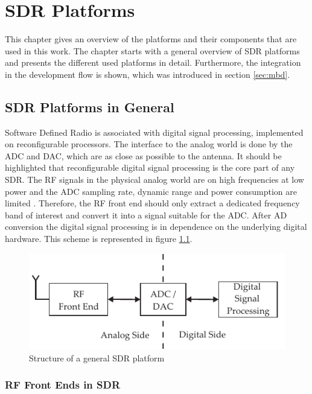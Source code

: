 \chapter{SDR Platforms}
\label{chap:plat}
This chapter gives an overview of the platforms and their components that are used in this work. The chapter starts with a general overview of SDR platforms and presents the different used platforms in detail. Furthermore, the integration in the development flow is shown, which was introduced in section \ref{sec:mbd}.

\section{SDR Platforms in General}

Software Defined Radio is associated with digital signal processing, implemented on reconfigurable processors. The interface to the analog world is done by the \ac{ADC} and \ac{DAC}, which are as close as possible to the antenna. It should be highlighted that reconfigurable digital signal processing is the core part of any SDR. The RF signals in the physical analog world are on high frequencies at low power and the \ac{ADC} sampling rate, dynamic range and power consumption are limited \cite{reed_SR}. Therefore, the RF front end should only extract a dedicated frequency band of interest and convert it into a signal suitable for the \ac{ADC}. After AD conversion the digital signal processing is in dependence on the underlying digital hardware. This scheme is represented in figure \ref{fig:SDR_platform}.

\begin{figure}
	\centering
		\includegraphics{../kapitel03/figures/SDR_platform.pdf}
	\caption{Structure of a general SDR platform}
	\label{fig:SDR_platform}
\end{figure}


\subsection{RF Front Ends in SDR}
